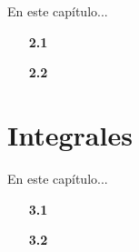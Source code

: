 \documentclass[justified,twoside,symmetric,explicit,letterpaper]{tufte-book} %
\numberwithin{figure}{chapter}
\begin{document}
\par En este cap\'itulo...


\begin{enumerate}[itemsep=2pt, leftmargin=10pt,itemindent=10pt]
    \item[\textbf{2.1}] 
    \item[\textbf{2.2}] 
    \end{enumerate}



\label{ch:unidad2}
\clearpage



\mainmatter
\graphicspath{{./ImagesMain/}} 
\setcounter{chapter}{2}

\renewcommand\chapterillustration{cover3}
\renewcommand\chapterwatermark{logo3}

\chapter{Integrales}

\par En este cap\'itulo...


 \begin{enumerate}[itemsep=2pt, leftmargin=10pt,itemindent=10pt]
     \item[\textbf{3.1}] 
     \item[\textbf{3.2}] 

\end{enumerate}



\label{ch:unidad3}
\clearpage


\end{document}
